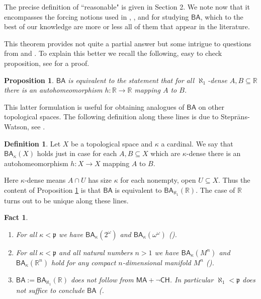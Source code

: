 \documentclass[leqno,11pt]{amsart}
\newtheorem{proposition}[theorem]{Proposition}
\newtheorem{fact}[theorem]{Fact}
\theoremstyle{definition}
\newtheorem{definition}[theorem]{Definition}
\theoremstyle{remark}
\def\MA{\mathsf{MA}}
\def\BA{\mathsf{BA}}
\def\baire{\omega^\omega}
\def\cantor{2^\omega}
\def\CH {\mathsf{CH}}
\def\mfp{\mathfrak{p}}
\begin{document}
The precise definition of ``reasonable" is given in Section 2. We note now that it encompasses the forcing notions used in \cite{Baum73}, \cite{BaumPFA}, \cite{ARS85} and \cite[Chapter 15]{todorcevicnotesonforcingaxioms} for studying $\BA$, which to the best of our knowledge are more or less all of them that appear in the literature. 

This theorem provides not quite a partial answer but some intrigue to questions from \cite{Todorcevic89} and \cite{Stepranswatson87}. To explain this better we recall the following, easy to check proposition, see \cite{Stepranswatson87} for a proof.

\begin{proposition}
    $\BA$ is equivalent to the statement that for all $\aleph_1$-dense $A, B \subseteq \mathbb R$ there is an autohomeomorphism $h:\mathbb R \to \mathbb R$ mapping $A$ to $B$. \label{propforBA}
    \end{proposition}
 This latter formulation is useful for obtaining analogues of $\BA$ on other topological spaces. The following definition along these lines is due to Stepr\=ans-Watson, see \cite{Stepranswatson87}.
 \begin{definition}
     Let $X$ be a topological space and $\kappa$ a cardinal. We say that $\BA_\kappa(X)$ holds just in case for each $A, B \subseteq X$ which are $\kappa$-dense there is an autohomeomorphism $h:X \to X$ mapping $A$ to $B$. 
 \end{definition}
Here $\kappa$-dense means $A \cap U$ has size $\kappa$ for each nonempty, open $U \subseteq X$. Thus the content of Proposition \ref{propforBA} is that $\BA$ is equivalent to $\BA_{\aleph_1}(\mathbb R)$. The case of $\mathbb R$ turns out to be unique along these lines. 
\begin{fact} \label{BAfacts}
    \begin{enumerate}
        \item For all $\kappa < \mfp$ we have $\BA_\kappa (\cantor)$ and $\BA_\kappa (\baire)$ (\cite{BaldwinBeaudoin89}).
        \item For all $\kappa < \mfp$ and all natural numbers $n > 1$ we have $\BA_\kappa (M^n)$ and $\BA_\kappa (\mathbb R^n)$ hold for any compact $n$-dimensional manifold $M^n$ (\cite{Stepranswatson87}).
        \item $\BA := 
        \BA_{\aleph_1} (\mathbb R)$ does not follow from $\MA + \neg \CH$. In particular $\aleph_1 < \mfp$ does not suffice to conclude $\BA$ (\cite{AvrahamShelah81}.
    \end{enumerate}
\end{fact}
\end{document}
